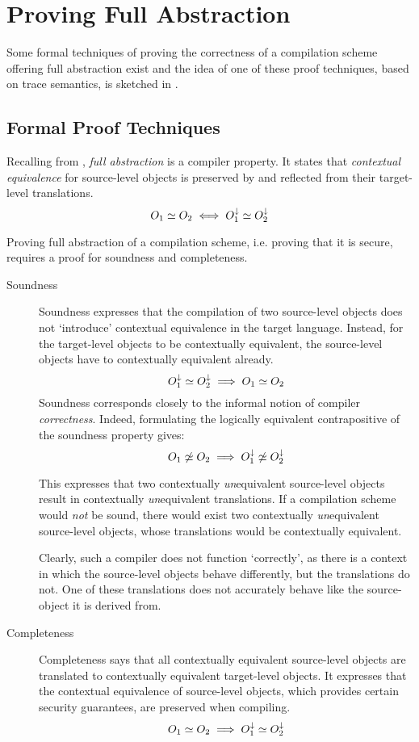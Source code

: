 \chapter{Proving Full Abstraction}
\label{chap:InformalProof}
Some formal techniques of proving the correctness of a compilation scheme offering full abstraction exist and the idea of one of these proof techniques, based on trace semantics, is sketched in .

\section{Formal Proof Techniques}
\label{sec:prooftechniques}
Recalling from , \emph{full abstraction} is a compiler property.
It states that \emph{contextual equivalence} for source-level objects is preserved by and reflected from their target-level translations.
\[
    O_{1} \simeq O_{2} \iff O_{1}^{\downarrow} \simeq O_{2}^{\downarrow}
\]

Proving full abstraction of a compilation scheme, i.e. proving that it is secure, requires a proof for soundness and completeness.
\begin{description}
\item[Soundness]
Soundness expresses that the compilation of two source-level objects does not `introduce' contextual equivalence in the target language.
Instead, for the target-level objects to be contextually equivalent, the source-level objects have to contextually equivalent already.
\[
    O_{1}^{\downarrow} \simeq O_{2}^{\downarrow} \implies O_{1} \simeq O_{2}
\]
Soundness corresponds closely to the informal notion of compiler \emph{correctness}.
Indeed, formulating the logically equivalent contrapositive of the soundness property gives:
\[
    O_{1} \not\simeq O_{2} \implies O_{1}^{\downarrow} \not\simeq O_{2}^{\downarrow}
\]

This expresses that two contextually \emph{un}equivalent source-level objects result in contextually \emph{un}equivalent translations.
If a compilation scheme would \emph{not} be sound, there would exist two contextually \emph{un}equivalent source-level objects, whose translations would be contextually equivalent.

Clearly, such a compiler does not function `correctly', as there is a context in which the source-level objects behave differently, but the translations do not.
One of these translations does not accurately behave like the source-object it is derived from.
\item[Completeness]
Completeness says that all contextually equivalent source-level objects are translated to contextually equivalent target-level objects.
It expresses that the contextual equivalence of source-level objects, which provides certain security guarantees, are preserved when compiling.
\[
    O_{1} \simeq O_{2} \implies O_{1}^{\downarrow} \simeq O_{2}^{\downarrow}
\]
\end{description}


